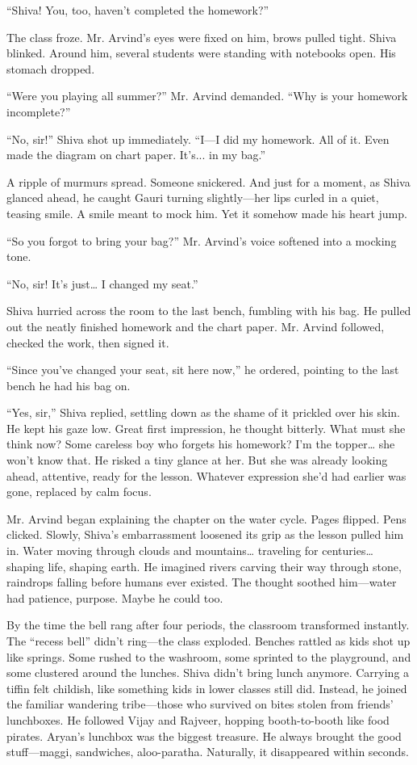 ``Shiva! You, too, haven't completed the homework?''

The class froze. Mr. Arvind's eyes were fixed on him, brows pulled tight. Shiva blinked. Around him, several students were standing with notebooks open. His stomach dropped.

``Were you playing all summer?'' Mr. Arvind demanded. ``Why is your homework incomplete?''

``No, sir!'' Shiva shot up immediately. ``I—I did my homework. All of it. Even made the diagram on chart paper. It's... in my bag.''

A ripple of murmurs spread. Someone snickered. And just for a moment, as Shiva glanced ahead, he caught Gauri turning slightly—her lips curled in a quiet, teasing smile. A smile meant to mock him. Yet it somehow made his heart jump.

``So you forgot to bring your bag?'' Mr. Arvind's voice softened into a mocking tone.

``No, sir! It's just… I changed my seat.''

Shiva hurried across the room to the last bench, fumbling with his bag. He pulled out the neatly finished homework and the chart paper. Mr. Arvind followed, checked the work, then signed it.

``Since you've changed your seat, sit here now,'' he ordered, pointing to the last bench he had his bag on.

``Yes, sir,'' Shiva replied, settling down as the shame of it prickled over his skin. He kept his gaze low. Great first impression, he thought bitterly. What must she think now? Some careless boy who forgets his homework? I'm the topper… she won't know that. He risked a tiny glance at her. But she was already looking ahead, attentive, ready for the lesson. Whatever expression she'd had earlier was gone, replaced by calm focus.

Mr. Arvind began explaining the chapter on the water cycle. Pages flipped. Pens clicked. Slowly, Shiva's embarrassment loosened its grip as the lesson pulled him in. Water moving through clouds and mountains… traveling for centuries… shaping life, shaping earth. He imagined rivers carving their way through stone, raindrops falling before humans ever existed. The thought soothed him—water had patience, purpose. Maybe he could too.

By the time the bell rang after four periods, the classroom transformed instantly. The ``recess bell'' didn't ring—the class exploded. Benches rattled as kids shot up like springs. Some rushed to the washroom, some sprinted to the playground, and some clustered around the lunches. Shiva didn't bring lunch anymore. Carrying a tiffin felt childish, like something kids in lower classes still did. Instead, he joined the familiar wandering tribe—those who survived on bites stolen from friends' lunchboxes. He followed Vijay and Rajveer, hopping booth-to-booth like food pirates. Aryan's lunchbox was the biggest treasure. He always brought the good stuff—maggi, sandwiches, aloo-paratha. Naturally, it disappeared within seconds.

